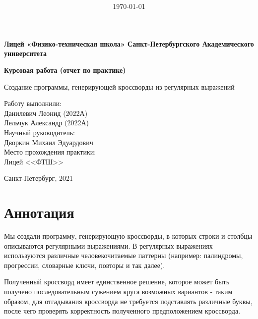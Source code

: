 \documentclass[12pt]{report}
\title{\bf \ReportTheme}
\author{\it \ReportAuthor}
\date{\today}
\begin{document}

    \begin{center}
    \large { {\bf Лицей «Физико-техническая школа»  Санкт-Петербургского Академического университета   } } 
    
    \vspace*{6\baselineskip}
    
    \vfill
    \large { {\bf Курсовая работа (отчет по практике) } } 
    
    \vspace*{6\baselineskip}
    
    Создание программы, генерирующей кроссворды из регулярных выражений \\
    \vspace*{3\baselineskip}

    \end{center}
    \begin{flushright}
        Работу выполнили: \\
        Данилевич Леонид (2022А) \\
        Лельчук Александр (2022А) \\
        Научный руководитель: \\
        Дворкин Михаил Эдуардович \\
        Место прохождения практики: \\
        Лицей <<ФТШ>>
    \end{flushright}
    \vspace*{5\baselineskip}
    \begin{center}
        Санкт-Петербург, 2021
    \end{center}
    \newpage %
    \chapter*{Аннотация}
    Мы создали программу, генерирующую кроссворды, в которых строки и столбцы описываются регулярными выражениями. В регулярных выражениях используются различные человекочитаемые паттерны (например: палиндромы, прогрессии, словарные ключи, повторы и так далее).

    Полученный кроссворд имеет единственное решение, которое может быть получено последовательным сужением круга возможных вариантов - таким образом, для отгадывания кроссворда не требуется подставлять различные буквы, после чего проверять корректность полученного предположением кроссворда.
\end{document}
